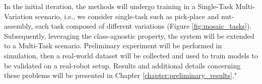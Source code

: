 In the initial iteration, the methods will undergo training in a Single-Task Multi-Variation scenario, i.e., we consider single-task such as pick-place and nut-assembly, each task composed of different variations (Figure \ref{fig:mosaic_tasks}). Subsequently, leveraging the class-agnostic property, the system will be extended to a Multi-Task scenario.
Preliminary experiment will be performed in simulation, then a real-world dataset will be collected and used to train models to be validated on a real-robot setup.
Results and additional details concerning these problems will be presented in Chapter \ref{chapter:preliminary_results}."
